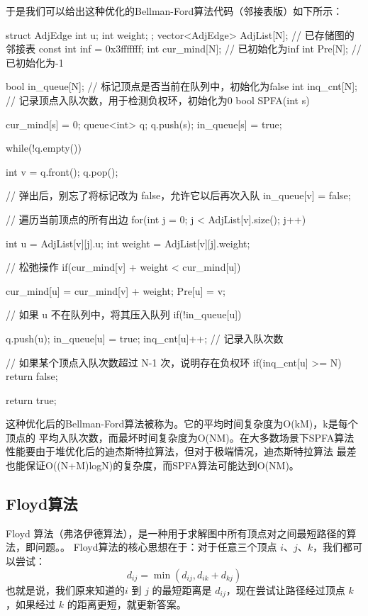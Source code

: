 于是我们可以给出这种优化的Bellman-Ford算法代码（邻接表版）如下所示：
\begin{cppcode}
    struct AdjEdge {
        int u;
        int weight;
    };
    vector<AdjEdge> AdjList[N]; // 已存储图的邻接表
    const int inf = 0x3fffffff;
    int cur_mind[N];    // 已初始化为inf
    int Pre[N];     // 已初始化为-1

    bool in_queue[N];   // 标记顶点是否当前在队列中，初始化为false
    int inq_cnt[N];         // 记录顶点入队次数，用于检测负权环，初始化为0
    bool SPFA(int s) {
        cur_mind[s] = 0;
        queue<int> q;
        q.push(s);
        in_queue[s] = true;

        while(!q.empty()) {
            int v = q.front();
            q.pop();
            
            // 弹出后，别忘了将标记改为 false，允许它以后再次入队
            in_queue[v] = false;

            // 遍历当前顶点的所有出边
            for(int j = 0; j < AdjList[v].size(); j++) {
                int u = AdjList[v][j].u;
                int weight = AdjList[v][j].weight;

                // 松弛操作
                if(cur_mind[v] + weight < cur_mind[u]) {
                    cur_mind[u] = cur_mind[v] + weight;
                    Pre[u] = v;

                    // 如果 u 不在队列中，将其压入队列
                    if(!in_queue[u]) {
                        q.push(u);
                        in_queue[u] = true;
                        inq_cnt[u]++; // 记录入队次数

                        // 如果某个顶点入队次数超过 N-1 次，说明存在负权环
                        if(inq_cnt[u] >= N) {
                            return false; 
                        }
                    }
                }
            }
        }

        return true; 
    }
\end{cppcode}

这种优化后的Bellman-Ford算法被称为。它的平均时间复杂度为O(kM)，k是每个顶点的
平均入队次数，而最坏时间复杂度为O(NM)。在大多数场景下SPFA算法性能要由于堆优化后的迪杰斯特拉算法，但对于极端情况，迪杰斯特拉算法
最差也能保证O((N+M)logN)的复杂度，而SPFA算法可能达到O(NM)。


\subsection{Floyd算法}
Floyd 算法（弗洛伊德算法），是一种用于求解图中所有顶点对之间最短路径的算法，即问题。。
Floyd算法的核心思想在于：对于任意三个顶点 \(i\)、\(j\)、\(k\)，我们都可以尝试：
\[
    d_{ij}=\min(d_{ij},d_{ik}+d_{kj})
\]
也就是说，我们原来知道的\(i\) 到 \(j\) 的最短距离是 \(d_{ij}\)，现在尝试让路径经过顶点 \(k\)，如果经过 \(k\) 的距离更短，就更新答案。

